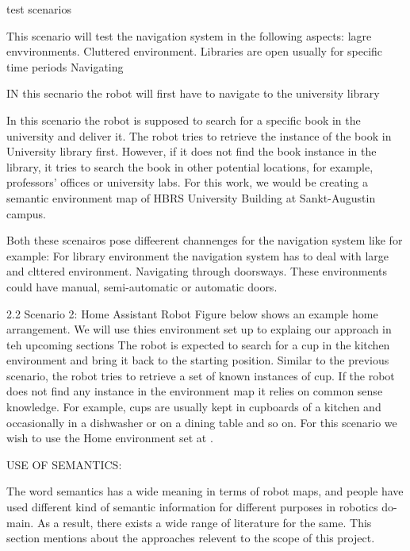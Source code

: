   
  
  test scenarios
  
  



This scenario will test the navigation system in the following aspects:
lagre envvironments.
Cluttered environment.
Libraries are open usually for specific time periods
Navigating 

IN this secnario the robot will first have to navigate to the university library 

In this scenario the robot is supposed to search for a specific book in the university
and deliver it. The robot tries to retrieve the instance of the book in University
library first. However, if it does not find the book instance in the library, it tries
to search the book in other potential locations, for example, professors’ offices or
university labs. For this work, we would be creating a semantic environment map
of HBRS University Building at Sankt-Augustin campus.



Both these scenairos pose diffeerent channenges for the navigation system like for example:
For library environment the navigation system has to deal with large and clttered environment.
Navigating through doorsways.
These environments could have manual, semi-automatic or automatic doors.



2.2
Scenario 2: Home Assistant Robot
Figure below shows an example home arrangement.
We will use thies environment set up to explaing our approach in teh upcoming sections
The robot is expected to search for a cup in the kitchen environment and bring it
back to the starting position. Similar to the previous scenario, the robot tries to
retrieve a set of known instances of cup. If the robot does not find any instance
in the environment map it relies on common sense knowledge. For example, cups
are usually kept in cupboards of a kitchen and occasionally in a dishwasher or on a
dining table and so on. For this scenario we wish to use the Home environment set
at .




USE OF SEMANTICS:



 
 The word semantics has a wide meaning in terms of robot maps, and people have
used different kind of semantic information for different purposes in robotics do-
main. As a result, there exists a wide range of literature for the same. This section
mentions about the approaches relevent to the scope of this project.



